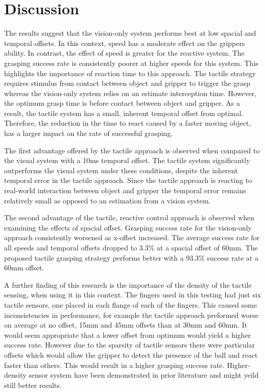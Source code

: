 \section{Discussion}

The results suggest that the vision-only system performs best at low spacial and temporal offsets. In this context, speed has a moderate effect on the grippers ability. In contrast, the effect of speed is greater for the reactive system. The grasping success rate is consistently poorer at higher speeds for this system. This highlights the importance of reaction time to this approach. The tactile strategy requires stimulus from contact between object and gripper to trigger the grasp whereas the vision-only system relies on an estimate interception time. However, the optimum grasp time is before contact between object and gripper. As a result, the tactile system has a small, inherent temporal offset from optimal. Therefore, the reduction in the time to react caused by a faster moving object, has a larger impact on the rate of successful grasping. 

The first advantage offered by the tactile approach is observed when compared  to the visual system with a 10ms temporal offset. The tactile system significantly outperforms the visual system under these conditions, despite the inherent temporal error in the tactile approach. Since the tactile approach is reacting to real-world interaction between object and gripper the temporal error remains relatively small as opposed to an estimation from a vision system. 

The second advantage of the tactile, reactive control approach is observed when examining the effects of spacial offset. Grasping success rate for the vision-only approach consistently worsened as x-offset increased. The average success rate for all speeds and temporal offsets dropped to 3.3\% at a spacial offset of 60mm. The proposed tactile grasping strategy performs better with a 93.3\% success rate at a 60mm offset. 

A further finding of this research is the importance of the density of the tactile sensing, when using it in this context. The fingers used in this testing had just six tactile sensors, one placed in each flange of each of the fingers. This caused some inconsistencies in performance, for example the tactile approach preformed worse on average at no offset, 15mm and 45mm offsets than at 30mm and 60mm. It would seem appropriate that a lower offset from optimum would yield a higher success rate. However due to the sparsity of tactile sensors there were particular offsets which would allow the gripper to detect the presence of the ball and react faster than others. This would result in a higher grasping success rate. Higher-density sensor system have been demonstrated in prior literature \cite{uSkinFingertip}\cite{Allegro} and might yeild still better results. 

